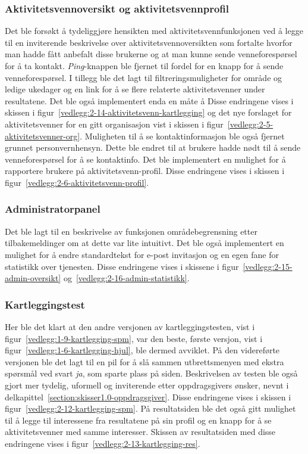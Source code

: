  
 \subsubsection{Aktivitetsvennoversikt og aktivitetsvennprofil}
 
 Det ble forsøkt å tydeliggjøre hensikten med aktivitetsvennfunksjonen ved å legge til en inviterende beskrivelse over aktivitetsvennoversikten som fortalte hvorfor man hadde fått anbefalt disse brukerne og at man kunne sende venneforespørsel for å ta kontakt. {\em  Ping}-knappen ble fjernet til fordel for en knapp for å sende venneforespørsel. I tillegg ble det lagt til filtreringsmuligheter for område og ledige ukedager og en link for å se flere relaterte aktivitetsvenner under resultatene. Det ble også implementert enda en måte å  Disse endringene vises i skissen i figur~\ref{vedlegg:2-14-aktivitetsvenn-kartlegging} og det nye forslaget for aktivitetsvenner for en gitt organisasjon vist i skissen i figur~\ref{vedlegg:2-5-aktivitetsvenner-org}. Muligheten til å se kontaktinformasjon ble også fjernet grunnet personvernhensyn. Dette ble endret til at brukere hadde nødt til å sende venneforespørsel for å se kontaktinfo. Det ble implementert en mulighet for å rapportere brukere på aktivitetsvenn-profil. Disse endringene vises i skissen i figur~\ref{vedlegg:2-6-aktivitetsvenn-profil}.
 
 \subsubsection{Administratorpanel}
 Det ble lagt til en beskrivelse av funksjonen områdebegrensning etter tilbakemeldinger om at dette var lite intuitivt. Det ble også implementert en mulighet for å endre standardtekst for e-post invitasjon og en egen fane for statistikk over tjenesten. Disse endringene vises i skissene i figur~\ref{vedlegg:2-15-admin-oversikt} og~\ref{vedlegg:2-16-admin-statistikk}.
 
 \subsubsection{Kartleggingstest}
 
 Her ble det klart at den andre versjonen av kartleggingstesten, vist i figur~\ref{vedlegg:1-9-kartlegging-spm}, var den beste, første versjon, vist i figur~\ref{vedlegg:1-6-kartlegging-hjul}, ble dermed avviklet. På den videreførte versjonen ble det lagt til en pil for å slå sammen utbrettsmenyen med ekstra spørsmål ved svart {\em  ja}, som sparte plass på siden. Beskrivelsen av testen ble også gjort mer tydelig, uformell og inviterende etter oppdragsgivers ønsker, nevnt i delkapittel~\ref{section:skisser1.0-oppdragsgiver}. Disse endringene vises i skissen i figur~\ref{vedlegg:2-12-kartlegging-spm}. På resultatsiden ble det også gitt mulighet til å legge til interessene fra resultatene på sin profil og en knapp for å se aktivitetsvenner med samme interesser. Skissen av resultatsiden med disse endringene vises i figur~\ref{vedlegg:2-13-kartlegging-res}.
 
